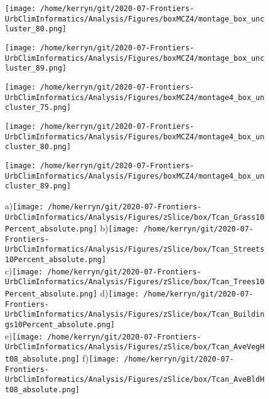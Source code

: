 \documentclass{article}
\begin{document}
\begin{figure}
\centering    
\texttt{[image: /home/kerryn/git/2020-07-Frontiers-UrbClimInformatics/Analysis/Figures/boxMCZ4/montage\_box\_uncluster\_80.png]}
\end{figure} 
\clearpage


\begin{figure}
\centering    
\texttt{[image: /home/kerryn/git/2020-07-Frontiers-UrbClimInformatics/Analysis/Figures/boxMCZ4/montage\_box\_uncluster\_89.png]}
\end{figure} 
\clearpage





\begin{figure}
\centering    
\texttt{[image: /home/kerryn/git/2020-07-Frontiers-UrbClimInformatics/Analysis/Figures/boxMCZ4/montage4\_box\_uncluster\_75.png]}
\end{figure} 
\clearpage

\begin{figure}
\centering    
\texttt{[image: /home/kerryn/git/2020-07-Frontiers-UrbClimInformatics/Analysis/Figures/boxMCZ4/montage4\_box\_uncluster\_80.png]}
\end{figure} 
\clearpage


\begin{figure}
\centering    
\texttt{[image: /home/kerryn/git/2020-07-Frontiers-UrbClimInformatics/Analysis/Figures/boxMCZ4/montage4\_box\_uncluster\_89.png]}
\end{figure} 
\clearpage







\begin{figure}
\centering    
a)\texttt{[image: /home/kerryn/git/2020-07-Frontiers-UrbClimInformatics/Analysis/Figures/zSlice/box/Tcan\_Grass10Percent\_absolute.png]}
b)\texttt{[image: /home/kerryn/git/2020-07-Frontiers-UrbClimInformatics/Analysis/Figures/zSlice/box/Tcan\_Streets10Percent\_absolute.png]}\\
c)\texttt{[image: /home/kerryn/git/2020-07-Frontiers-UrbClimInformatics/Analysis/Figures/zSlice/box/Tcan\_Trees10Percent\_absolute.png]}
d)\texttt{[image: /home/kerryn/git/2020-07-Frontiers-UrbClimInformatics/Analysis/Figures/zSlice/box/Tcan\_Buildings10Percent\_absolute.png]}\\
e)\texttt{[image: /home/kerryn/git/2020-07-Frontiers-UrbClimInformatics/Analysis/Figures/zSlice/box/Tcan\_AveVegHt08\_absolute.png]}
f)\texttt{[image: /home/kerryn/git/2020-07-Frontiers-UrbClimInformatics/Analysis/Figures/zSlice/box/Tcan\_AveBldHt08\_absolute.png]}
\end{figure} 
\clearpage
\end{document}
